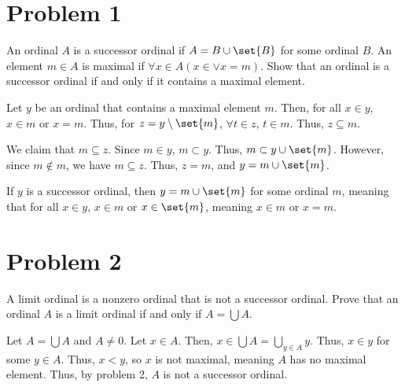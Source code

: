 \documentclass[12pt]{mypackage}
\begin{document}
\RaggedRight
\section{Problem 1}%
\begin{problem}
  An ordinal $A$ is a successor ordinal if $A = B\cup \set{B}$ for some ordinal $B$. An element $m\in A$ is maximal if $\forall x\in A\left(x \in \vee x = m\right)$. Show that an ordinal is a successor ordinal if and only if it contains a maximal element.
\end{problem}
\begin{solution}
  Let $y$ be an ordinal that contains a maximal element $m$. Then, for all $x\in y$, $x\in m$ or $x = m$. Thus, for $z = y\setminus \set{m}$, $\forall t\in z$, $ t\in m$. Thus, $z\subseteq m$. \newline

  We claim that $m\subseteq z$. Since $m\in y$, $m\subset y$. Thus, $m\subset y\cup \set{m}$. However, since $m\notin m$, we have $m\subseteq z$. Thus, $z = m$, and $y = m\cup\set{m}$.\newline

  If $y$ is a successor ordinal, then $y = m\cup\set{m}$ for some ordinal $m$, meaning that for all $x\in y$, $x\in m$ or $x \in \set{m}$, meaning $x\in m$ or $x = m$.
  
\end{solution}
\section{Problem 2}%
\begin{problem}
  A limit ordinal is a nonzero ordinal that is not a successor ordinal. Prove that an ordinal $A$ is a limit ordinal if and only if $A = \bigcup A$.
\end{problem}
\begin{solution}
  Let $A = \bigcup A$ and $A\neq 0$. Let $x\in A$. Then, $x\in \bigcup A = \bigcup_{y\in A}y$. Thus, $x\in y$ for some $y\in A$. Thus, $x < y$, so $x$ is not maximal, meaning $A$ has no maximal element. Thus, by problem 2, $A$ is not a successor ordinal.
\end{solution}
\end{document}
